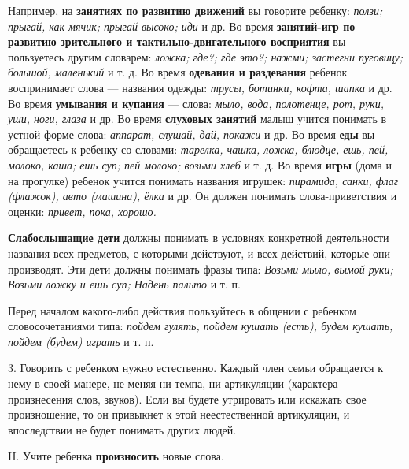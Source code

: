 \documentclass[a5paper]{book}
\renewcommand{\emph}[1]{\textit{#1}}
\begin{document}
Например, на \textbf{занятиях по развитию движений} вы говорите ребенку:
\emph{ползи; прыгай, как мячик; прыгай высоко; иди} и др. Во время
\textbf{занятий-игр по развитию зрительного и тактильно-двигательного
восприятия} вы пользуетесь другим словарем: \emph{ложка; где?; где это?;
нажми; застегни пуговицу; большой, маленький} и т. д. Во время
\textbf{одевания и раздевания} ребенок воспринимает слова --- названия
одежды: \emph{трусы, ботинки, кофта, шапка} и др. Во время
\textbf{умывания и купания} --- слова: \emph{мыло, вода, полотенце, рот,
руки, уши, ноги, глаза} и др. Во время \textbf{слуховых занятий} малыш
учится понимать в устной форме слова: \emph{аппарат, слушай, дай,
покажи} и др. Во время \textbf{еды} вы обращаетесь к ребенку со словами:
\emph{тарелка, чашка, ложка, блюдце, ешь, пей, молоко, каша; ешь суп;
пей молоко; возьми хлеб} и т. д. Во время \textbf{игры} (дома и на
прогулке) ребенок учится понимать названия игрушек: \emph{пирамида,
санки, флаг (флажок), авто (машина), ёлка} и др. Он должен понимать
слова-приветствия и оценки: \emph{привет, пока, хорошо.}

\textbf{Слабослышащие дети} должны понимать в условиях конкретной
деятельности названия всех предметов, с которыми действуют, и всех
действий, которые они производят. Эти дети должны понимать фразы типа:
\emph{Возьми мыло, вымой руки; Возьми ложку и ешь суп; Надень пальто} и
т. п.

Перед началом какого-либо действия пользуйтесь в общении с ребенком
словосочетаниями типа: \emph{пойдем гулять, пойдем кушать (есть), будем
кушать, пойдем (будем) играть} и т. п.

3. Говорить с ребенком нужно естественно. Каждый член семьи обращается к
нему в своей манере, не меняя ни темпа, ни артикуляции (характера
произнесения слов, звуков). Если вы будете утрировать или искажать свое
произношение, то он привыкнет к этой неестественной артикуляции, и
впоследствии не будет понимать других людей.

II. Учите ребенка \textbf{произносить} новые слова.
\end{document}
